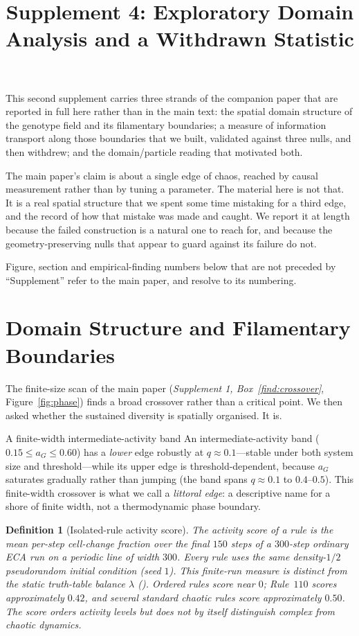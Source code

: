 \documentclass[man,12pt,floatsintext,donotrepeattitle]{apa7}
\title{Supplement 4: Exploratory Domain Analysis and a Withdrawn Statistic}
\newcommand{\secref}[1]{\emph{\nameref{#1}}}
\newtheorem{scoredef}{Definition}
\begin{document}
\maketitle

This second supplement carries three strands of the companion paper that are reported
in full here rather than in the main text: the spatial domain structure of the
genotype field and its filamentary boundaries; a measure of information
transport along those boundaries that we built, validated against three nulls,
and then withdrew; and the domain/particle reading that motivated both.

The main paper's claim is about a single edge of chaos, reached by causal
measurement rather than by tuning a parameter. The material here is not that. It
is a real spatial structure that we spent some time mistaking for a third edge,
and the record of how that mistake was made and caught. We report it at length
because the failed construction is a natural one to reach for, and because the
geometry-preserving nulls that appear to guard against its failure do not.

Figure, section and empirical-finding numbers below that are not preceded by
``Supplement'' refer to the main paper, and resolve to its numbering.

\section{Domain Structure and Filamentary Boundaries}
\label{supp:domains}

The finite-size scan of the main paper (\emph{Supplement 1, Box~\ref{find:crossover}},
Figure~\ref{fig:phase}) finds a broad crossover rather than a critical point. We then asked whether the
sustained diversity is spatially organised. It is.

\begin{empiricalfinding}[label={find:littoral}]{A finite-width intermediate-activity band}
An intermediate-activity band ($0.15 \le a_G \le 0.60$) has a \emph{lower} edge
robustly at $q \approx 0.1$---stable under both system size and threshold---while
its upper edge is threshold-dependent, because $a_G$ saturates gradually rather
than jumping (the band spans $q \approx 0.1$ to $0.4$--$0.5$). This finite-width
crossover is what we call a \emph{littoral edge}: a descriptive name for a shore
of finite width, not a thermodynamic phase boundary.
\end{empiricalfinding}

\begin{scoredef}[Isolated-rule activity score]\label{def:activity}
The \emph{activity score} of a rule is the mean per-step cell-change fraction
over the final $150$ steps of a $300$-step ordinary ECA run on a periodic line
of width $300$. Every rule uses the same density-$1/2$ pseudorandom initial
condition (seed $1$). This finite-run measure is distinct from the static
truth-table balance $\lambda$ (\secref{sec:lambda}). Ordered rules score near
$0$; Rule~$110$ scores approximately $0.42$, and several standard chaotic rules
score approximately $0.50$. The score orders activity levels but does not by
itself distinguish complex from chaotic dynamics.
\end{scoredef}
\end{document}
